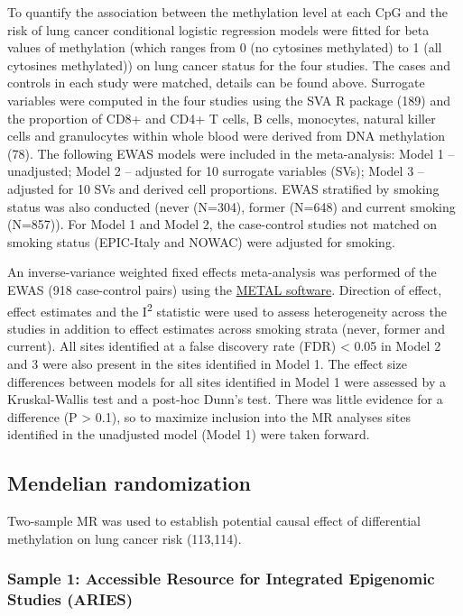 \documentclass[11pt,oneside]{bristolthesis}
\begin{document}
To quantify the association between the methylation level at each CpG and the risk of lung cancer conditional logistic regression models were fitted for beta values of methylation (which ranges from 0 (no cytosines methylated) to 1 (all cytosines methylated)) on lung cancer status for the four studies. The cases and controls in each study were matched, details can be found above. Surrogate variables were computed in the four studies using the SVA R package (189) and the proportion of CD8+ and CD4+ T cells, B cells, monocytes, natural killer cells and granulocytes within whole blood were derived from DNA methylation (78). The following EWAS models were included in the meta-analysis: Model 1 -- unadjusted; Model 2 -- adjusted for 10 surrogate variables (SVs); Model 3 -- adjusted for 10 SVs and derived cell proportions. EWAS stratified by smoking status was also conducted (never (N=304), former (N=648) and current smoking (N=857)). For Model 1 and Model 2, the case-control studies not matched on smoking status (EPIC-Italy and NOWAC) were adjusted for smoking.

An inverse-variance weighted fixed effects meta-analysis was performed of the EWAS (918 case-control pairs) using the \href{http://csg.sph.umich.edu/abecasis/metal/}{METAL software}. Direction of effect, effect estimates and the I\textsuperscript{2} statistic were used to assess heterogeneity across the studies in addition to effect estimates across smoking strata (never, former and current). All sites identified at a false discovery rate (FDR) \textless{} 0.05 in Model 2 and 3 were also present in the sites identified in Model 1. The effect size differences between models for all sites identified in Model 1 were assessed by a Kruskal-Wallis test and a post-hoc Dunn's test. There was little evidence for a difference (P \textgreater{} 0.1), so to maximize inclusion into the MR analyses sites identified in the unadjusted model (Model 1) were taken forward.

\hypertarget{methods-mendelian-randomization-07}{%
\subsection{Mendelian randomization}\label{methods-mendelian-randomization-07}}

Two-sample MR was used to establish potential causal effect of differential methylation on lung cancer risk (113,114).

\hypertarget{sample-1-accessible-resource-for-integrated-epigenomic-studies-aries}{%
\subsubsection{Sample 1: Accessible Resource for Integrated Epigenomic Studies (ARIES)}\label{sample-1-accessible-resource-for-integrated-epigenomic-studies-aries}}
\end{document}
